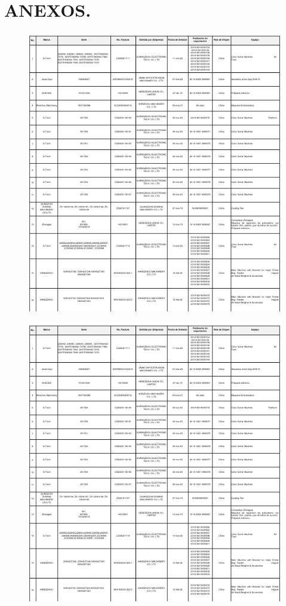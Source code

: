 \chapter{ANEXOS.} %

\begin{figure}[hbtp!]
	\centering
	\includegraphics[width= 0.9 \linewidth, page = 1]{../0.imagenes/CAP_13/cap_13}
\end{figure}
\newpage

\begin{figure}[hbtp!]
	\centering
	\includegraphics[width=  \linewidth, page = 2]{../0.imagenes/CAP_13/cap_13}
\end{figure}
\newpage


